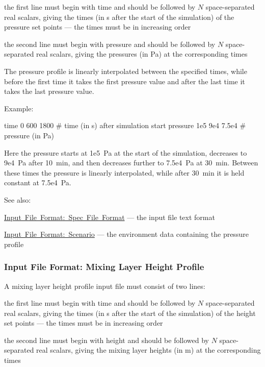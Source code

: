 \begin{DoxyItemize}
\item the first line must begin with {\ttfamily time} and should be followed by $N$ space-\/separated real scalars, giving the times (in s after the start of the simulation) of the pressure set points --- the times must be in increasing order
\item the second line must begin with {\ttfamily pressure} and should be followed by $N$ space-\/separated real scalars, giving the pressures (in Pa) at the corresponding times
\end{DoxyItemize}

The pressure profile is linearly interpolated between the specified times, while before the first time it takes the first pressure value and after the last time it takes the last pressure value.

Example\+: 
\begin{DoxyPre}
 time      0    600  1800  \# time (in s) after simulation start
 pressure  1e5  9e4  7.5e4 \# pressure (in Pa)
 \end{DoxyPre}
 Here the pressure starts at 1e5~Pa at the start of the simulation, decreases to 9e4~Pa after 10~min, and then decreases further to 7.\+5e4~Pa at 30~min. Between these times the pressure is linearly interpolated, while after 30~min it is held constant at 7.\+5e4~Pa.

See also\+:
\begin{DoxyItemize}
\item \mbox{\hyperlink{spec_file_format}{Input File Format\+: Spec File Format}} --- the input file text format
\item \mbox{\hyperlink{input_format_scenario}{Input File Format\+: Scenario}} --- the environment data containing the pressure profile 
\end{DoxyItemize}\hypertarget{input_format_height_profile}{}\subsubsection{Input File Format\+: Mixing Layer Height Profile}\label{input_format_height_profile}
A mixing layer height profile input file must consist of two lines\+:


\begin{DoxyItemize}
\item the first line must begin with {\ttfamily time} and should be followed by $N$ space-\/separated real scalars, giving the times (in s after the start of the simulation) of the height set points --- the times must be in increasing order
\item the second line must begin with {\ttfamily height} and should be followed by $N$ space-\/separated real scalars, giving the mixing layer heights (in m) at the corresponding times
\end{DoxyItemize}

